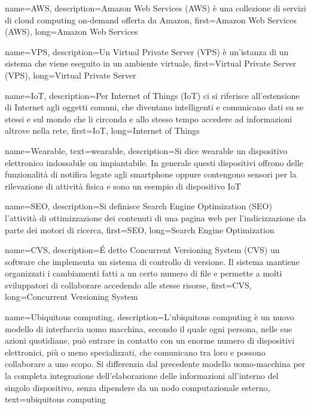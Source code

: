 {
    name={AWS},
    description={Amazon Web Services (AWS) è una collezione di servizi di cloud computing on-demand offerta da Amazon},
    first={Amazon Web Services (AWS)},
    long={Amazon Web Services}
}

{
    name={VPS},
    description={Un Virtual Private Server (VPS) è un'istanza di un sistema che viene eseguito in un ambiente virtuale},
    first={Virtual Private Server (VPS)},
    long={Virtual Private Server}
}

{
    name={IoT},
    description={Per Internet of Things (IoT) ci si riferisce all'estensione di Internet agli oggetti comuni, che diventano intelligenti e comunicano dati su se stessi e sul mondo che li circonda e allo stesso tempo accedere ad informazioni altrove nella rete},
    first={IoT},
    long={Internet of Things}
}

{
    name={Wearable},
    text={wearable},
    description={Si dice wearable un dispositivo elettronico indossabile on impiantabile. In generale questi dispositivi offrono delle funzionalità di notifica legate agli smartphone oppure contengono sensori per la rilevazione di attività fisica e sono un esempio di dispositivo \gls{IoT}}
}

{
    name={SEO},
    description={Si definisce Search Engine Optimization (SEO) l'attività di ottimizzazione dei contenuti di una pagina web per l'indicizzazione da parte dei motori di ricerca},
    first={SEO},
    long={Search Engine Optimization}
}

{
    name={CVS},
    description={É detto Concurrent Versioning System (CVS) un software che implementa un sistema di controllo di versione. Il sistema mantiene organizzati i cambiamenti fatti a un certo numero di file e permette a molti sviluppatori di collaborare accedendo alle stesse risorse},
    first={CVS},
    long={Concurrent Versioning System}
}

{
    name={Ubiquitous computing},
    description={L'ubiquitous computing è un nuovo modello di interfaccia uomo macchina, secondo il quale ogni persona, nelle sue azioni quotidiane, può entrare in contatto con un enorme numero di dispositivi elettronici, più o meno specializzati, che comunicano tra loro e possono collaborare a uno scopo. Si differenzia dal precedente modello uomo-macchina per la completa integrazione dell'elaborazione delle informazioni all'interno del singolo dispositivo, senza dipendere da un nodo computazionale esterno},
    text={ubiquitous computing}
}


